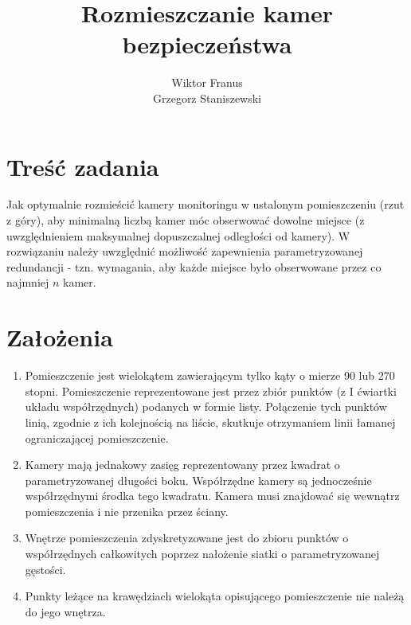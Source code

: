\documentclass[12pt,a4paper]{article}
\title{Rozmieszczanie kamer bezpieczeństwa}
\author{Wiktor Franus \\ Grzegorz Staniszewski}
\begin{document}
\maketitle
\tableofcontents

\newpage
\section{Treść zadania}
Jak optymalnie rozmieścić kamery monitoringu w ustalonym pomieszczeniu (rzut z góry), aby minimalną liczbą kamer móc obserwować dowolne miejsce (z uwzględnieniem maksymalnej dopuszczalnej odległości od kamery). W rozwiązaniu należy uwzględnić możliwość zapewnienia parametryzowanej redundancji - tzn. wymagania, aby każde miejsce było obserwowane przez co najmniej $n$ kamer.

\section{Założenia}
\begin{enumerate}

\item Pomieszczenie jest wielokątem zawierającym tylko kąty o mierze 90 lub 270 stopni. 
Pomieszczenie reprezentowane jest przez zbiór punktów (z I ćwiartki układu współrzędnych) podanych w formie listy. 
Połączenie tych punktów linią, zgodnie z ich kolejnością na liście, skutkuje otrzymaniem linii łamanej ograniczającej pomieszczenie.
\item Kamery mają jednakowy zasięg reprezentowany przez kwadrat o parametryzowanej długości boku. 
Współrzędne kamery są jednocześnie współrzędnymi środka tego kwadratu. 
Kamera musi znajdować się wewnątrz pomieszczenia i nie przenika przez ściany.
\item Wnętrze pomieszczenia zdyskretyzowane jest do zbioru punktów o współrzędnych całkowitych poprzez nałożenie siatki o parametryzowanej gęstości.
\item Punkty leżące na krawędziach wielokąta opisującego pomieszczenie nie należą do jego wnętrza.
\end{enumerate}
\end{document}
